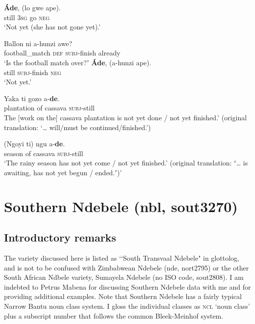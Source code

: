 \begin{exe}
	\ex\label{exAppendixSangoNotYet1}
	\gll \textbf{Áde},	(lo	gwe	ape).\\
	still \phantom{(}3\textsc{sg}	go	\textsc{neg}\\
	\glt \lq Not yet (she has not gone yet).' \parencite[117]{NassensteinPasch2021}

	\ex\label{exAppendixSangoNotYet2}
	\begin{xlist}
		\gll Ballon ni a-hunzi awe?\\
		football\_match \textsc{def} \textsc{subj}-finish already\\
		\glt \lq Is the football match over?ʼ
		\gll \textbf{Áde}, \textup{(}a-hunzi ape\textup{)}.\\
		still \phantom{(}\textsc{subj}-finish \textsc{neg}\\
		\glt \lq Not yet.' \parencite[116]{NassensteinPasch2021}
	\end{xlist}

	\ex\label{exAppendixSangoNotYet3}
	\gll Yaka ti gozo	 a-\textbf{de}.\\
	plantation	of cassava \textsc{subj}-still\\
	\glt The [work on the] cassava plantation is not yet done / not yet finished.' (original translation: \lq… will/must be continued/finished.') \parencite[115]{NassensteinPasch2021}

	\ex\label{exAppendixSangoNotYet4}
	\gll (Ngoyi	ti) ngu a-\textbf{de}.\\
	season of	cassava \textsc{subj}-still\\
	\glt \lq The rainy season has not yet come / not yet finished.' (original translation: ʻ… is awaiting, has not yet begun / ended.ʼ)\rq{ }\parencite[115]{NassensteinPasch2021}
\end{exe}

\section{Southern Ndebele (nbl, sout3270)}

\subsection{Introductory remarks}
The variety discussed here is listed as \lq\lq South Transvaal Ndebele" in glottolog, and is not to be confused with Zimbabwean Ndebele (nde, nort2795) or the other South African Ndbele variety, Sumayela Ndebele (no ISO code, sout2808). I am indebted to Petrus Mabena for discussing Southern Ndebele data with me and for providing additional examples. Note that Southern Ndebele has a fairly typical Narrow Bantu noun class system. I gloss the individual classes as \textsc{ncl} \lq noun class' plus a subscript number that follows the common Bleek-Meinhof system.

